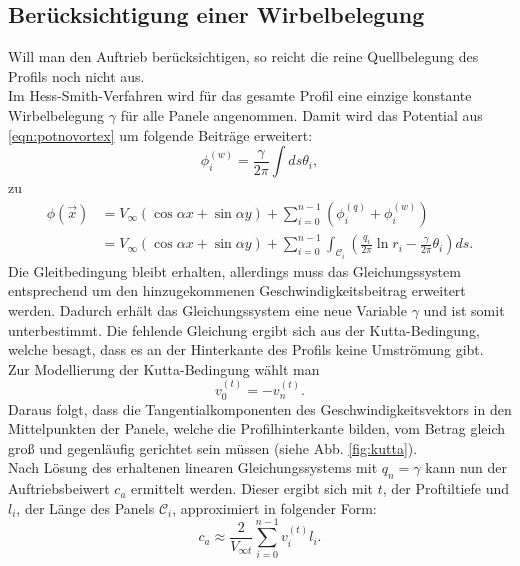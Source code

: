 \subsection{Berücksichtigung einer Wirbelbelegung}
Will man den Auftrieb berücksichtigen, so reicht die reine Quellbelegung des Profils noch nicht aus. \\
Im Hess-Smith-Verfahren wird für das gesamte Profil eine einzige konstante Wirbelbelegung $\gamma$ für alle Panele angenommen. Damit wird das Potential aus \eqref{eqn:potnovortex} um folgende Beiträge erweitert:
\begin{equation}
\phi_i^{(w)} =  \frac{\gamma}{2 \pi } \int ds \theta_i,
\end{equation}
zu
\begin{align}
\phi(\vec x) &=  V_{\infty} (\cos \alpha x + \sin \alpha y) + \sum_{i=0}^{n-1} \left( \phi_i^{(q)} + \phi_i^{(w)} \right) \nonumber \\
&= V_{\infty} (\cos \alpha x + \sin \alpha y) + \sum_{i=0}^{n-1} \int_{\mathcal{C}_i} \left( \frac{q_i}{2\pi } \ln r_i - \frac{\gamma}{2\pi } \theta_{i} \right) ds.
\end{align}
Die Gleitbedingung bleibt erhalten, allerdings muss das Gleichungssystem entsprechend um den hinzugekommenen Geschwindigkeitsbeitrag erweitert werden. Dadurch erhält das Gleichungssystem eine neue Variable $\gamma$ und ist somit unterbestimmt. Die fehlende Gleichung ergibt sich aus der Kutta-Bedingung, welche besagt, dass es an der Hinterkante des Profils keine Umströmung gibt.\\
Zur Modellierung der Kutta-Bedingung wählt man
\begin{equation}
v_0^{(t)} =  -v_n^{(t)}.
\end{equation} 
Daraus folgt, dass die Tangentialkomponenten des Geschwindigkeitsvektors in den Mittelpunkten der Panele, welche die Profilhinterkante bilden, vom Betrag gleich groß und gegenläufig gerichtet sein müssen (siehe Abb. \ref{fig:kutta}). \\
Nach Lösung des erhaltenen linearen Gleichungssystems mit $q_n = \gamma$ kann nun der Auftriebsbeiwert $c_a$ ermittelt werden. Dieser ergibt sich mit $t$, der Proftiltiefe und $l_i$, der Länge des Panels $\mathcal{C}_i$, approximiert in folgender Form:
\begin{equation}
c_a \approx \frac{2}{V_{\infty t}}\sum_{i=0}^{n-1} v_i^{(t)} l_i.
\end{equation}

